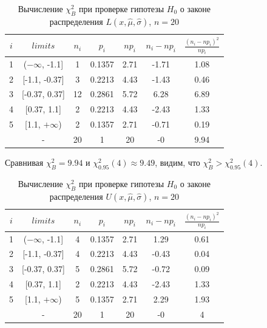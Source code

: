 \begin{table}[H]
	\centering
	\begin{tabular}{| c | c | c | c | c | c | c |}
		\hline
		$i$ & $limits$         &   $n_i$ &    $p_i$ &   $np_i$ &   $n_i - np_i$ &   $\frac{(n_i-np_i)^2}{np_i}$ \\
		\hline
		1 & ($-\infty$, -1.1] &     1 & 0.1357 &   2.71 &        -1.71 &                        1.08 \\
		2 & [-1.1, -0.37]  &     3 & 0.2213 &   4.43 &        -1.43 &                        0.46 \\
		3 & [-0.37, 0.37]  &    12 & 0.2861 &   5.72 &         6.28 &                        6.89 \\
		4 & [0.37, 1.1]    &     2 & 0.2213 &   4.43 &        -2.43 &                        1.33 \\
		5 & [1.1, $+\infty$)   &     2 & 0.1357 &   2.71 &        -0.71 &                        0.19 \\
		\sum & -              &    20 & 1      &  20    &        -0    &                        9.94 \\
		\hline
	\end{tabular}
	\caption{ Вычисление $\chi^{2}_{B}$ при проверке гипотезы $H_{0}$ о законе распределения $L(x,\hat{\mu}, \hat{\sigma})$, $n=20$}
	\label{tab:laplace_chi_2}
\end{table}
\noindent Сравнивая $\chi^{2}_{B} = 9.94$ и $\chi^{2}_{0.95}(4) \approx 9.49$, видим, что $\chi^{2}_{B} > \chi^{2}_{0.95}(4)$.

\begin{table}[H]
	\centering
	\begin{tabular}{| c | c | c | c | c | c | c |}
		\hline
		$i$ & $limits$         &   $n_i$ &    $p_i$ &   $np_i$ &   $n_i - np_i$ &   $\frac{(n_i-np_i)^2}{np_i}$ \\
		\hline
		1 & ($-\infty$, -1.1] &     4 & 0.1357 &   2.71 &         1.29 &                        0.61 \\
		2 & [-1.1, -0.37]  &     4 & 0.2213 &   4.43 &        -0.43 &                        0.04 \\
		3 & [-0.37, 0.37]  &     5 & 0.2861 &   5.72 &        -0.72 &                        0.09 \\
		4 & [0.37, 1.1]    &     2 & 0.2213 &   4.43 &        -2.43 &                        1.33 \\
		5 & [1.1, $+\infty$)   &     5 & 0.1357 &   2.71 &         2.29 &                        1.93 \\
		\sum & -              &    20 & 1      &  20    &        -0    &                        4    \\
		\hline
	\end{tabular}
	\caption{ Вычисление $\chi^{2}_{B}$ при проверке гипотезы $H_{0}$ о законе распределения $U(x,\hat{\mu}, \hat{\sigma})$, $n=20$}
	\label{tab:uniform_chi_2}
\end{table}

